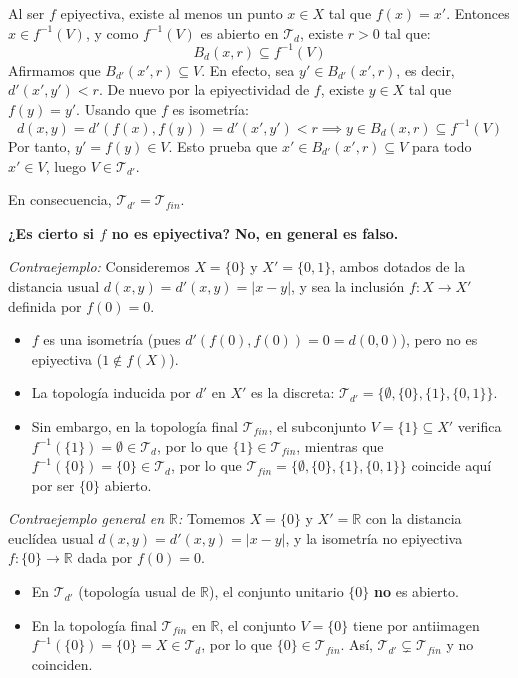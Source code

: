 \begin{enumerate}
\begin{enumerate}
\begin{dem}
\begin{itemize}
            Al ser $f$ epiyectiva, existe al menos un punto $x \in X$ tal que $f(x) = x'$. Entonces $x \in f^{-1}(V)$, y como $f^{-1}(V)$ es abierto en $\mathcal{T}_d$, existe $r > 0$ tal que:
            \[
                B_d(x, r) \subseteq f^{-1}(V)
            \]
            Afirmamos que $B_{d'}(x', r) \subseteq V$. En efecto, sea $y' \in B_{d'}(x', r)$, es decir, $d'(x', y') < r$. De nuevo por la epiyectividad de $f$, existe $y \in X$ tal que $f(y) = y'$. Usando que $f$ es isometría:
            \[
                d(x, y) = d'(f(x), f(y)) = d'(x', y') < r \implies y \in B_d(x, r) \subseteq f^{-1}(V)
            \]
            Por tanto, $y' = f(y) \in V$. Esto prueba que $x' \in B_{d'}(x', r) \subseteq V$ para todo $x' \in V$, luego $V \in \mathcal{T}_{d'}$.
        \end{itemize}
        En consecuencia, $\mathcal{T}_{d'} = \mathcal{T}_{fin}$.

        \medskip

        \textbf{¿Es cierto si $f$ no es epiyectiva?} \textbf{No, en general es falso.}
        
        \textit{Contraejemplo:} Consideremos $X = \{0\}$ y $X' = \{0, 1\}$, ambos dotados de la distancia usual $d(x,y) = d'(x,y) = |x - y|$, y sea la inclusión $f : X \to X'$ definida por $f(0) = 0$.
        \begin{itemize}
            \item $f$ es una isometría (pues $d'(f(0), f(0)) = 0 = d(0,0)$), pero no es epiyectiva ($1 \notin f(X)$).
            \item La topología inducida por $d'$ en $X'$ es la discreta: $\mathcal{T}_{d'} = \{\emptyset, \{0\}, \{1\}, \{0, 1\}\}$.
            \item Sin embargo, en la topología final $\mathcal{T}_{fin}$, el subconjunto $V = \{1\} \subseteq X'$ verifica $f^{-1}(\{1\}) = \emptyset \in \mathcal{T}_d$, por lo que $\{1\} \in \mathcal{T}_{fin}$, mientras que $f^{-1}(\{0\}) = \{0\} \in \mathcal{T}_d$, por lo que $\mathcal{T}_{fin} = \{\emptyset, \{0\}, \{1\}, \{0,1\}\}$ coincide aquí por ser $\{0\}$ abierto.
        \end{itemize}
        \textit{Contraejemplo general en $\mathbb{R}$:} Tomemos $X = \{0\}$ y $X' = \mathbb{R}$ con la distancia euclídea usual $d(x,y) = d'(x,y) = |x-y|$, y la isometría no epiyectiva $f : \{0\} \to \mathbb{R}$ dada por $f(0) = 0$.
        \begin{itemize}
            \item En $\mathcal{T}_{d'}$ (topología usual de $\mathbb{R}$), el conjunto unitario $\{0\}$ \textbf{no} es abierto.
            \item En la topología final $\mathcal{T}_{fin}$ en $\mathbb{R}$, el conjunto $V = \{0\}$ tiene por antiimagen $f^{-1}(\{0\}) = \{0\} = X \in \mathcal{T}_d$, por lo que $\{0\} \in \mathcal{T}_{fin}$. Así, $\mathcal{T}_{d'} \subsetneq \mathcal{T}_{fin}$ y no coinciden.
        \end{itemize}
    \end{dem}
\end{enumerate}


\end{enumerate}

